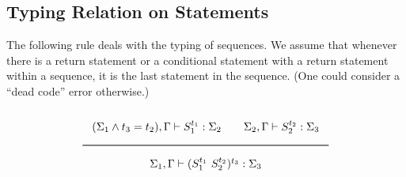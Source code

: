 

\subsection{Typing Relation on Statements}

The following rule deals with the typing of sequences. We assume that
whenever there is a return statement or a conditional statement with a return statement within a
sequence, it is the last statement in the sequence.
(One could consider a ``dead code'' error otherwise.)

\[
\Rule{
  (\Sigma_1 \wedge t_3 = t_2), \Gamma \vdash S_1^{t_1} : \Sigma_2 \qquad 
  \Sigma_2, \Gamma \vdash S_2^{t_2} : \Sigma_3}{
\Sigma_1, \Gamma \vdash (S_1^{t_1}\ S_2^{t_2})^{t_3}  : \Sigma_3}
\]

